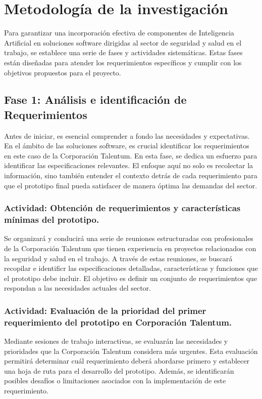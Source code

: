 \section{Metodología de la investigación}

Para garantizar una incorporación efectiva de componentes de Inteligencia Artificial en soluciones software dirigidas al sector de seguridad y salud en el trabajo, se establece una serie de fases y actividades sistemáticas. Estas fases están diseñadas para atender los requerimientos específicos y cumplir con los objetivos propuestos para el proyecto.

\subsection{Fase 1: Análisis e identificación de Requerimientos}
Antes de iniciar, es esencial comprender a fondo las necesidades y expectativas. En el ámbito de las soluciones software, es crucial identificar los requerimientos en este caso de la Corporación Talentum. En esta fase, se dedica un esfuerzo para identificar las especificaciones relevantes. El enfoque aquí no solo es recolectar la información, sino también entender el contexto detrás de cada requerimiento para que el prototipo final pueda satisfacer de manera óptima las demandas del sector.

\subsubsection{Actividad: Obtención de requerimientos y características mínimas del prototipo.}
Se organizará y conducirá una serie de reuniones estructuradas con profesionales de la Corporación Talentum que tienen experiencia en proyectos relacionados con la seguridad y salud en el trabajo. A través de estas reuniones, se buscará recopilar e identificr las especificaciones detalladas, características y funciones que el prototipo debe incluir. El objetivo es definir un conjunto de requerimientos que respondan a las necesidades actuales del sector.

\subsubsection{Actividad: Evaluación de la prioridad del primer requerimiento del prototipo en Corporación Talentum.}
Mediante sesiones de trabajo interactivas, se evaluarán las necesidades y prioridades que la Corporación Talentum considera más urgentes. Esta evaluación permitirá determinar cuál requerimiento deberá abordarse primero y establecer una hoja de ruta para el desarrollo del prototipo. Además, se identificarán posibles desafíos o limitaciones asociados con la implementación de este requerimiento.

